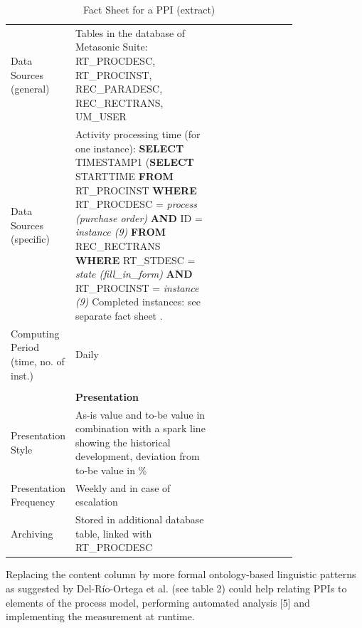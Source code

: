\begin{table}[htbp]
\begin{tabular}[t]{@{}l p{0.5\linewidth} p{0.3\linewidth} @{}}
		\\
		Data Sources (general) & Tables in the database of Metasonic Suite:
		RT\_PROCDESC, RT\_PROCINST, REC\_PARADESC, REC\_RECTRANS, UM\_USER
		\\
		Data Sources (specific) & Activity processing time (for one instance):\newline
		\textbf{SELECT} TIMESTAMP1  \newline
		(\textbf{SELECT} STARTTIME \newline
		\textbf{FROM} RT\_PROCINST \newline
		\textbf{WHERE} RT\_PROCDESC = \textit{process (purchase order)}\newline
		\textbf{AND} ID = \textit{instance (9)}\newline
		\textbf{FROM} REC\_RECTRANS\newline
		\textbf{WHERE} RT\_STDESC = \textit{\textit{state (fill\_in\_form)}}\newline
		\textbf{AND} RT\_PROCINST = \textit{instance (9)}
		Completed instances: see separate fact sheet .
		\\
		Computing Period (time, no. of inst.) & Daily
		\\
		& &
		\\
		& \textbf{Presentation}
		\\
		Presentation Style & As-is value and to-be value in combination with a spark line showing the historical development, deviation from to-be value in \%
		\\
		Presentation Frequency & Weekly and in case of escalation
		\\
		Archiving & Stored in additional database table, linked with RT\_PROCDESC
		\\
		
\bottomrule
\end{tabular}
\caption{Fact Sheet for a PPI (extract)}
\label{tbl:Fact-Sheet}
\end{table}

Replacing the content column by more formal ontology-based linguistic patterns as suggested by Del-Río-Ortega et al. (see table 2) could help relating PPIs to elements of the process model, performing automated analysis [5] and implementing the measurement at runtime. 

